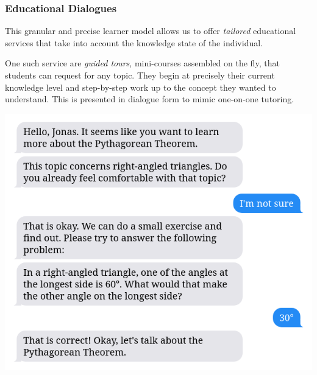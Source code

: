 \documentclass[aspectratio=169, usenames, dvipsnames]{beamer}
\begin{document}
\begin{frame}
\frametitle{Educational Dialogues}
\begin{minipage}{0.45\textwidth}
This granular and precise learner model allows us to offer \emph{tailored}
educational services that take into account the knowledge state of the individual.
\bigskip

One such service are \emph{guided tours}, mini-courses assembled on the fly, that students can request for any topic. They begin at precisely their current knowledge level and step-by-step work up to the concept they wanted to understand. This is presented in dialogue form to mimic one-on-one tutoring.
\end{minipage}%
\hfill
\begin{minipage}{0.5\textwidth}
\includegraphics[height=0.75\textheight,keepaspectratio]{images/bubbles_example_step5} 
\end{minipage}%
\end{frame}
\end{document}
